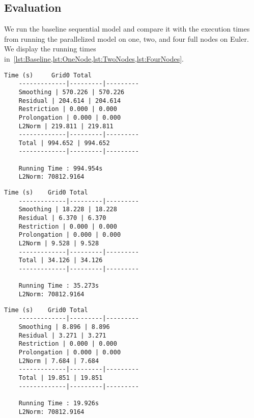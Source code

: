 \documentclass[11pt]{article}
\begin{document}
    \subsection*{Evaluation}
    \label{subsec:Task1Eval}

    We run the baseline sequential model and compare it with the execution
    times from running the parallelized model on one, two, and four full nodes
    on Euler.
    We display the running times
    in~\cref{lst:Baseline,lst:OneNode,lst:TwoNodes,lst:FourNodes}.

    \begin{lstlisting}[basicstyle=\scriptsize, caption={Output from running
    the baseline sequential model on one full node.}, float, floatplacement=h,
    frame=single, label={lst:Baseline}]
    Time (s)     Grid0 Total
    -------------|---------|---------
    Smoothing | 570.226 | 570.226
    Residual | 204.614 | 204.614
    Restriction | 0.000 | 0.000
    Prolongation | 0.000 | 0.000
    L2Norm | 219.811 | 219.811
    -------------|---------|---------
    Total | 994.652 | 994.652
    -------------|---------|---------

    Running Time : 994.954s
    L2Norm: 70812.9164
    \end{lstlisting}
    \begin{lstlisting}[basicstyle=\scriptsize, caption={Output from running
    the parallelized model on one full node.}, float, floatplacement=h,
    frame=single, label={lst:OneNode}]
    Time (s)    Grid0 Total
    -------------|---------|---------
    Smoothing | 18.228 | 18.228
    Residual | 6.370 | 6.370
    Restriction | 0.000 | 0.000
    Prolongation | 0.000 | 0.000
    L2Norm | 9.528 | 9.528
    -------------|---------|---------
    Total | 34.126 | 34.126
    -------------|---------|---------

    Running Time : 35.273s
    L2Norm: 70812.9164
    \end{lstlisting}
    \begin{lstlisting}[basicstyle=\scriptsize, caption={Output from running
    the parallelized model on two full nodes.}, float, floatplacement=h,
    frame=single, label={lst:TwoNodes}]
    Time (s)    Grid0 Total
    -------------|---------|---------
    Smoothing | 8.896 | 8.896
    Residual | 3.271 | 3.271
    Restriction | 0.000 | 0.000
    Prolongation | 0.000 | 0.000
    L2Norm | 7.684 | 7.684
    -------------|---------|---------
    Total | 19.851 | 19.851
    -------------|---------|---------

    Running Time : 19.926s
    L2Norm: 70812.9164
    \end{lstlisting}
\end{document}
